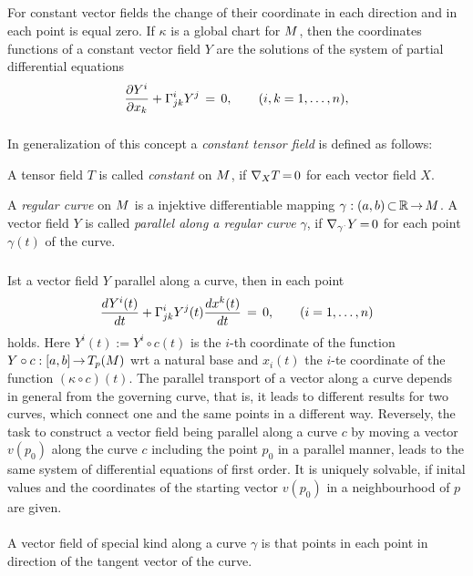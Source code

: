 \documentclass[11pt,twoside]{article}
\begin{document}
\subparagraph{}
For constant vector fields the change of their coordinate
in each direction and in each point is equal zero.
If $\kappa$ is a global chart for $\difM$,
then the coordinates functions of a constant vector field $Y$
are the solutions of the system of partial differential equations
\[
\frac {\partial Y^i}{\partial x_k} + \Gamma^i_{jk} Y^j \= 0,
\qquad (i,k=1,\ldots,n),
\]

\subparagraph{}
In generalization of this concept a \textit{constant tensor field}
is defined as follows:

\begin{definition}
A tensor field $T$ is called \textit{constant} on $\difM$,
if $\nabla_X T \eq 0$ for each vector field $X$.
\end{definition}

\begin{definition}
A \textit{regular curve} on $\difM$ is a injektive differentiable
mapping $\gamma:(a,b) \xsubset \R \xto \difM$.
A vector field $Y$ is called \textit{parallel along a regular curve} $\gamma$,
if $\nabla_{\gamma^{\cdot}} Y \eq 0$ for each point $\gamma(t)$ of the curve.
\end{definition}

\subparagraph{}
Ist a vector field $Y$ parallel along a curve,
then in each point
\[
\frac {dY^i(t)}{dt} + \Gamma^i_{jk} Y^j(t) \frac {dx^k(t)}{dt} \= 0,
\qquad (i=1,\ldots,n)
\]
holds.
Here $Y^i(t) := Y^i \circ c(t)$ is the $i$-th coordinate of the function
$Y \circ c:[a,b] \xto T_p(M)$ {wrt} a natural base and
$x_i(t)$ the $i$-te coordinate of the function $(\kappa \circ c)(t)$.
The parallel transport of a vector along a curve depends in general
from the governing curve,
that is,
it leads to different results for two curves,
which connect one and the same points in a different way.
Reversely,
the task to construct a vector field being parallel along a curve $c$
by moving
a vector $v(p_0)$ along the curve $c$ including the point
$p_0$ in a parallel manner,
leads to the same system of differential equations of first order.
It is uniquely solvable,
if inital values and the coordinates
of the starting vector $v(p_0)$ in a neighbourhood of $p$ are given.

\paragraph{}
A vector field of special kind along a curve $\gamma$ is 
that points in each point in direction of the tangent vector of the curve.
\end{document}
